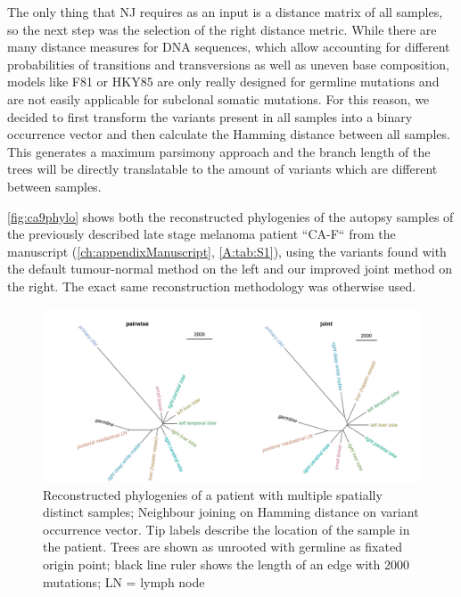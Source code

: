 The only thing that NJ requires as an input is a distance matrix of all samples, so the next step was the selection of the right distance metric. While there are many distance measures for DNA sequences, which allow accounting for different probabilities of transitions and transversions as well as uneven base composition, models like F81 \cite{Felsenstein1981} or HKY85 \cite{Hasegawa1985} are only really designed for germline mutations and are not easily applicable for subclonal somatic mutations. For this reason, we  decided to first transform the variants present in all samples into a binary occurrence vector and then calculate the Hamming distance \cite{Hamming1950} between all samples. This generates a maximum parsimony approach and the branch length of the trees will be directly translatable to the amount of variants which are different between samples. 

\autoref{fig:ca9phylo} shows both the reconstructed phylogenies of the autopsy samples of the previously described late stage melanoma patient ``CA-F`` from the manuscript (\autoref{ch:appendixManuscript}, \autoref{A:tab:S1}), using the variants found with the default tumour-normal method on the left and our improved joint method on the right. The exact same reconstruction methodology was otherwise used.

\begin{figure}[ht]
\centering
\includegraphics[width=.99\linewidth]{Figures/jointVariantCalling/phyloCA9.pdf}
\caption[Reconstructed phylogenies of joint samples]{Reconstructed phylogenies of a patient with multiple spatially distinct samples; Neighbour joining on Hamming distance on variant occurrence vector. Tip labels describe the location of the sample in the patient. Trees are shown as unrooted with germline as fixated origin point; black line ruler shows the length of an edge with 2000 mutations; LN = lymph node}\label{fig:ca9phylo}
\end{figure}


